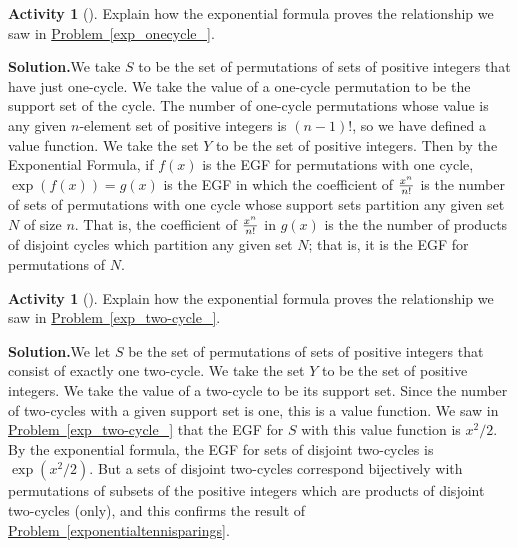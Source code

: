 \documentclass[10pt,]{book}
\theoremstyle{plain}
\theoremstyle{definition}
\newtheorem{activity}[project]{Activity}
\numberwithin{equation}{chapter}
\begin{document}
\begin{activity}[]\label{activity-114}
Explain how the exponential formula proves the relationship we saw in \hyperref[exp_onecycle_]{Problem~\ref{exp_onecycle_}}.%
\par\medskip\noindent%
\textbf{Solution.}\quad We take \(S\) to be the set of permutations of sets of positive integers that have just one-cycle. We take the value of a one-cycle permutation to be the support set of the cycle. The number of one-cycle permutations whose value is any given \(n\)-element set of positive integers is \((n-1)!\), so we have defined a value function. We take the set \(Y\) to be the set of positive integers. Then by the Exponential Formula, if \(f(x)\) is the EGF for permutations with one cycle, \(\exp(f(x))=g(x)\) is the EGF in which the coefficient of \(x^n\over n!\) is the number of sets of permutations with one cycle whose support sets partition any given set \(N\) of size \(n\). That is, the coefficient of \(x^n\over n!\) in \(g(x)\) is the the number of products of disjoint cycles which partition any given set \(N\); that is, it is the EGF for permutations of \(N\).%
\end{activity}
\begin{activity}[]\label{activity-115}
Explain how the exponential formula proves the relationship we saw in \hyperref[exp_two-cycle_]{Problem~\ref{exp_two-cycle_}}.%
\par\medskip\noindent%
\textbf{Solution.}\quad We let \(S\) be the set of permutations of sets of positive integers that consist of exactly one two-cycle. We take the set \(Y\) to be the set of positive integers. We take the value of a two-cycle to be its support set. Since the number of two-cycles with a given support set is one, this is a value function. We saw in \hyperref[exp_two-cycle_]{Problem~\ref{exp_two-cycle_}} that the EGF for \(S\) with this value function is \(x^2/2\). By the exponential formula, the EGF for sets of disjoint two-cycles is \(\exp(x^2/2)\). But a sets of disjoint two-cycles correspond bijectively with permutations of subsets of the positive integers which are products of disjoint two-cycles (only), and this confirms the result of \hyperref[exponentialtennisparings]{Problem~\ref{exponentialtennisparings}}.%
\end{activity}
\end{document}
